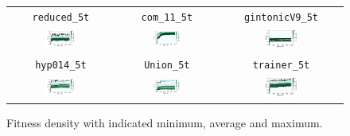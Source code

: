 \documentclass[11pt,a4paper]{scrartcl}
\begin{document}
\begin{figure}[H]
\center
\begin{tabular}{ccc}
\texttt{reduced\_5t} & \texttt{com\_11\_5t} & \texttt{gintonicV9\_5t} \\
\includegraphics[width=0.3\textwidth]{img/standard_reduced_5t.png} &
\includegraphics[width=0.3\textwidth]{img/standard_com_11_5t.png} &
\includegraphics[width=0.3\textwidth]{img/standard_gintonicV9_5t.png} \\
\texttt{hyp014\_5t} & \texttt{Union\_5t} & \texttt{trainer\_5t} \\
\includegraphics[width=0.3\textwidth]{img/standard_hyp014_5t.png} &
\includegraphics[width=0.3\textwidth]{img/standard_Union_5t.png} &
\includegraphics[width=0.3\textwidth]{img/standard_trainer_5t.png}
\end{tabular}
\caption{Fitness density with indicated minimum, average and maximum.}
\label{fig:standard_5t}
\end{figure}
\end{document}
